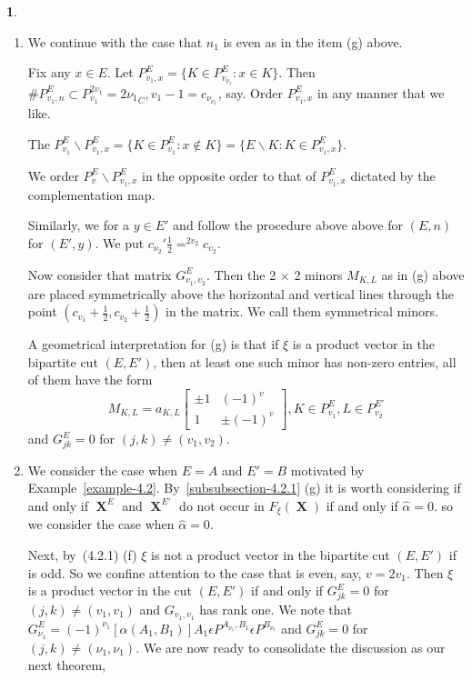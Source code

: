 \documentclass[a4paper,12pt]{article}
\DeclareMathOperator{\x}{\mathrm{X}}
\theoremstyle{definition}
\theoremstyle{underlinethm}
\theoremstyle{definition}
\newtheorem{subsubsec}{}[subsection]
\begin{document}
\begin{subsubsec}
\begin{enumerate}[label=(\alph*)]
\item We continue with the case that $n_{1}$ is even as in the item (g) above.

Fix any $x\in E$. Let $P_{v_{1}, x}^{E} = \{K \in P_{v_{\nu_{1}}}^{E} : x\in K\}$. Then $\# P_{v_{1}, n}^{E} \subset P_{v_{1}}^{2v_{1}} = 2\nu{_{1}}_{C}, v_{1}-1=c_{\nu_{\nu_{1}}}$, say. Order $P_{v_{1}, x}^{E}$ in any manner that we like.

The $P_{v_{1}}^{E} \smallsetminus P_{v_{1}, x}^{E} = \{K \in P_{v_{1}}^{E} : x \notin K\} = \{E \smallsetminus K : K \in P_{v_{1}, x}^{E}\}$.

We order $P_{v}^{E} \smallsetminus P_{v_{1}, x}^{E}$ in the opposite order to that of $P_{v_{1}, x}^{E}$ dictated by the complementation map.

Similarly, we for a $y \in E'$ and follow the procedure above above for $(E, n)$ for $(E', y)$. We put $c_{\nu_{2}}'\frac{1}{2} = ^{2v_{2}}c_{v_{2}}$. 

Now consider that matrix $G_{v_{1}, v_{2}}^{E}$. Then the 2 $\times$ 2 minors $M_{K,L}$ as in (g) above are placed symmetrically above the horizontal and vertical lines through the point $(c_{v_{1}} + \frac{1}{2}, c_{v_{2}} + \frac{1}{2})$ in the matrix. We call them symmetrical minors.

A geometrical interpretation for (g) is that if $\xi$ is a product vector  in the bipartite cut $(E, E')$, then at least one such minor has non-zero entries, all of them have the form
$$
M_{K, L} = a_{K, L}\begin{bmatrix}\pm 1 & (-1)^{v}\\ 1 & \pm (-1)^{v} \end{bmatrix}, K \in P_{v_{1}}^{E}, L \in P_{v_{2}}^{E'}
$$ 
and $G_{j k}^{E}=0$ for $(j,k) \neq (v_{1}, v_{2})$.

\item We consider the case when $E = A$ and $E'=B$ motivated by Example~\eqref{example-4.2}. By~\eqref{subsubsection-4.2.1} (g) it is worth considering if and only if $\boldsymbol{\x}^{E}$ and $\boldsymbol{\x}^{E'}$ do not occur in $F_{\xi}(\boldsymbol{\x})$ if and only if $\hat{\alpha} =0$. so we consider the case when $\hat{\alpha}=0$.

Next, by~(4.2.1) (f) $\xi$ is not a product vector in the bipartite cut $(E, E')$ if is odd. So we confine attention to the case that is even, say, $v=2v_{1}$. Then $\xi$ is a product vector in the cut $(E, E')$ if and only if $G_{jk}^{E}=0$ for $(j, k)\neq (v_{1}, v_{1})$ and $G_{v_{1}, v_{1}}$ has rank one. We note that $G^{E}_{\nu_{1}}=(-1)^{\nu_{1}}[\alpha (A_{1}, B_{1})] A_{1} \epsilon P^{A_{\nu_{1}}, B_{1}} \epsilon P^{B_{\nu_{1}}}$ and $G^{E}_{jk} =0$ for $(j,k) \neq (\nu_{1}, \nu_{1})$. We are now ready to consolidate the discussion as our next theorem,


\end{enumerate}

\end{subsubsec}
\end{document}
